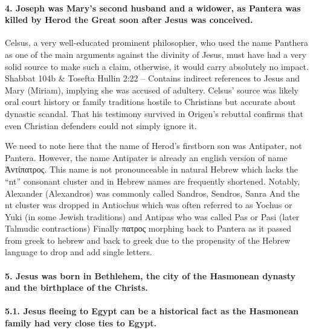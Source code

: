 \paragraph{4.
Joseph was Mary's second husband and a widower, as Pantera was killed by Herod the Great soon after Jesus was conceived.}\label{par:joseph-was-marys-second-husband-and-a-widower-as-pantera-was-killed-by-herod-the-great-soon-after-jesus-was-conceived.}

Celsus, a very well-educated prominent philosopher, who used the name Panthera as one of the main arguments against the divinity of Jesus, must have had a very solid source to make such a claim, otherwise, it would carry absolutely no impact.
Shabbat 104b \& Tosefta Hullin 2:22 -- Contains indirect references to Jesus and Mary (Miriam), implying she was accused of adultery.
Celsus’ source was likely oral court history or family traditions hostile to Christians but accurate about dynastic scandal. That his testimony survived in Origen’s rebuttal confirms that even Christian defenders could not simply ignore it.

We need to note here that the name of Herod's firstborn son was Antipater, not Pantera.
However, the name Antipater is already an english version of name Ἀντίπατρος.
This name is not pronounceable in natural Hebrew which lacks the ``nt'' consonant cluster and in Hebrew names are frequently shortened.
Notably, Alexander (Alexandros) was commonly called Sandros, Sendros, Sanra And the nt cluster was dropped in Antiochus which was often referred to as Yochus or Yuki (in some Jewish traditions) and Antipas who was called Pas or Pasi (later Talmudic contractions) Finally πατρος morphing back to Pantera as it passed from greek to hebrew and back to greek due to the propensity of the Hebrew language to drop and add single letters.

\paragraph{5.
Jesus was born in Bethlehem, the city of the Hasmonean dynasty and the birthplace of the Christs.}\label{par:jesus-was-born-in-bethlehem-the-city-of-the-hasmonean-dynasty-and-the-birthplace-of-the-christs.}

\paragraph{5.1.
Jesus fleeing to Egypt can be a historical fact as the Hasmonean family had very close ties to Egypt.}\label{par:jesus-fleeing-to-egypt-can-be-a-historical-fact-as-the-hasmonean-family-had-very-close-ties-to-egypt.}


